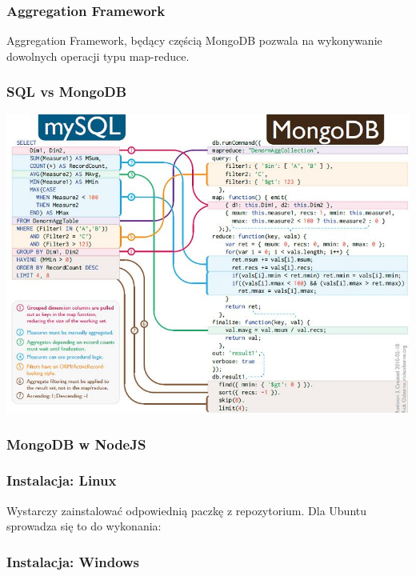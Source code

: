 \documentclass{beamer}
\begin{document}
  \begin{frame}
    \frametitle{Aggregation Framework}
    Aggregation Framework, będący częścią MongoDB pozwala na wykonywanie dowolnych operacji typu map-reduce.
  \end{frame}

  \begin{frame}
    \frametitle{SQL vs MongoDB}
    \includegraphics[width=\textwidth,keepaspectratio]{img/mysql_vs_mongodb.jpg}
  \end{frame}

  \begin{frame}
    \frametitle{MongoDB w NodeJS}
    
  \end{frame}

  \begin{frame}
    \frametitle{Instalacja: Linux}
    Wystarczy zainstalować odpowiednią paczkę z repozytorium. Dla Ubuntu sprowadza się to do wykonania:

    
  \end{frame}

  \begin{frame}
    \frametitle{Instalacja: Windows}
  \end{frame}
\end{document}
